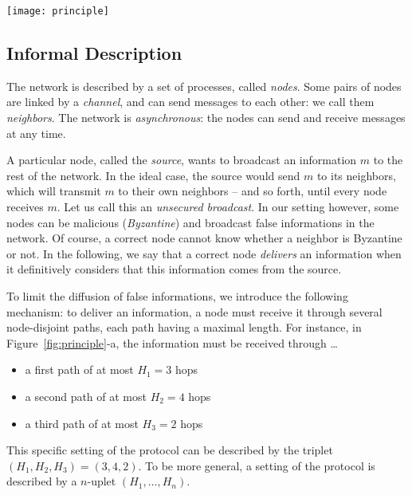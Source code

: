 \documentclass[a4paper,11pt]{article}
\begin{document}
\begin{figure*}
\begin{center}
\texttt{[image: principle]}
\caption{Principle of the protocol} 
\label{fig:principle}
\end{center}
\end{figure*}

\subsection{Informal Description}
\label{informal}

The network is described by a set of processes, called \emph{nodes}. Some pairs of nodes are linked by a \emph{channel}, and can send messages to each other: we call them \emph{neighbors}. The network is \emph{asynchronous}: the nodes can send and receive messages at any time.

A particular node, called the \emph{source}, wants to broadcast an information $m$ to the rest of the network. In the ideal case, the source would send $m$ to its neighbors, which will transmit $m$ to their own neighbors -- and so forth, until every node receives $m$. Let us call this an \emph{unsecured broadcast}. In our setting however, some nodes can be malicious (\emph{Byzantine}) and broadcast false informations in the network. Of course, a correct node cannot know whether a neighbor is Byzantine or not.
In the following, we say that a correct node \emph{delivers} an information when it definitively considers that this information comes from the source.

To limit the diffusion of false informations, we introduce the following mechanism:
to deliver an information, a node must receive it through several node-disjoint paths, each path having a maximal length. For instance, in Figure~\ref{fig:principle}-a, the information must be received through \dots

\begin{itemize}
\item a first path of at most $H_1 = 3$ hops
\item a second path of at most $H_2 = 4$ hops
\item a third path of at most $H_3 = 2$ hops
\end{itemize}

This specific setting of the protocol can be described by the triplet $(H_1,H_2,H_3) = (3,4,2)$. To be more general, a setting of the protocol is described by a $n$-uplet $(H_1,\dots,H_n)$.
\end{document}

